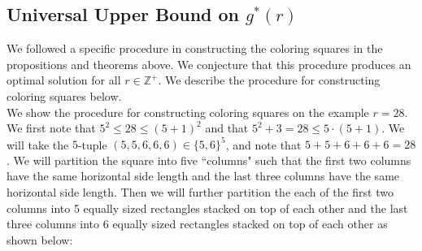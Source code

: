 \documentclass{article}
\begin{document}
\begin{center}
\section{Universal Upper Bound on $g^*(r)$}
\end{center}

We followed a specific procedure in constructing the coloring squares in the propositions and theorems above. We conjecture that this procedure produces an optimal solution for all $r \in \mathbb{Z}^{+}$. We describe the procedure for constructing coloring squares below. \\

We show the procedure for constructing coloring squares on the example $r = 28$. We first note that $5^2 \leq 28 \leq (5+1)^2$ and that $5^2 + 3 = 28 \leq 5 \cdot (5+1)$. We will take the $5$-tuple $(5,5,6,6,6) \in \{5,6\}^{5}$, and note that $5 + 5 + 6 + 6 + 6 = 28$. We will partition the square into five ``columns" such that the first two columns have the same horizontal side length and the last three columns have the same horizontal side length. Then we will further partition the each of the first two columns into 5 equally sized rectangles stacked on top of each other and the last three columns into 6 equally sized rectangles stacked on top of each other as shown below: \\
\end{document}
